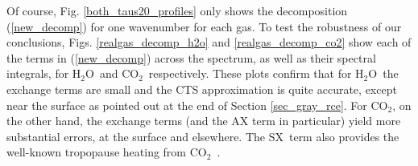 \documentclass{ametsoc}
\newcommand{\beqn}{\begin{equation}}
\newcommand{\eeqn}{\end{equation}}
\newcommand{\n}{\nonumber}
\newcommand{\eqnref}[1]{(\ref{#1})}
\newcommand{\ppp}{\ensuremath{\partial_p}}
\newcommand{\Cp}{\ensuremath{C_p}}
\newcommand{\cotwo}{\ensuremath{\mathrm{CO_2}}}
\newcommand{\htwo}{\ensuremath{\mathrm{H_2O}}}
\newcommand{\ch}{\ensuremath{\mathcal{H}}}
\newcommand{\chk}{\ensuremath{\ch_k}}
\newcommand{\SX}{\ensuremath{\mathrm{SX}}}
\newcommand{\CTS}{\ensuremath{\mathrm{CTS}}}
\begin{document}
Of course, Fig. \ref{both_taus20_profiles} only shows the decomposition \eqnref{new_decomp} for one wavenumber for each gas. To test the robustness of our conclusions, Figs. \ref{realgas_decomp_h2o} and \ref{realgas_decomp_co2} show each of the terms in \eqnref{new_decomp} across the spectrum, as well as their spectral integrals, for \htwo\ and \cotwo\ respectively. These plots confirm that for \htwo\ the exchange terms are small and the CTS approximation is quite accurate, except near the surface as pointed out at the end of Section \ref{sec_gray_rce}. For \cotwo, on the other hand, the exchange terms (and the AX term in particular) yield more substantial errors, at the surface and elsewhere. The \SX\ term also provides the well-known tropopause heating from \cotwo\ \citep[e.g.][]{thuburn2002,zhu1992}.





 
\end{document}
